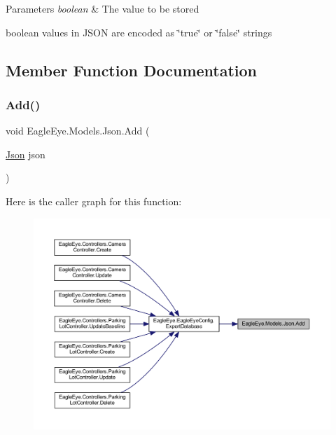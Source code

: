 \begin{DoxyParams}{Parameters}
{\em boolean} & The value to be stored\\
\hline
\end{DoxyParams}


boolean values in J\+S\+ON are encoded as \char`\"{}true\char`\"{} or \char`\"{}false\char`\"{} strings

\subsection{Member Function Documentation}
\mbox{\label{class_eagle_eye_1_1_models_1_1_json_a4b23b3ec238276219d3d953b385fac93}} 
\subsubsection{\texorpdfstring{Add()}{Add()}}
{\footnotesize\ttfamily void Eagle\+Eye.\+Models.\+Json.\+Add (\begin{DoxyParamCaption}\item[{\mbox{\hyperlink{class_eagle_eye_1_1_models_1_1_json}{Json}}}]{json }\end{DoxyParamCaption})}





Here is the caller graph for this function\+:
\nopagebreak
\begin{figure}[H]
\begin{center}
\leavevmode
\includegraphics[width=350pt]{class_eagle_eye_1_1_models_1_1_json_a4b23b3ec238276219d3d953b385fac93_icgraph}
\end{center}
\end{figure}
\mbox{\label{class_eagle_eye_1_1_models_1_1_json_a140f24f32b5b39c66584f13eb2fbf586}} 
